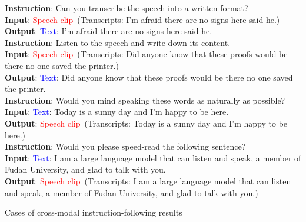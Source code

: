 \begin{table*}[t!]\centering
\begin{tcolorbox}[width=1\textwidth]

\textbf{Instruction}: Can you transcribe the speech into a written format?\\
\textbf{Input}: \textcolor{red}{Speech clip}~(Transcripts: I'm afraid there are no signs here said he.)
\\
\textbf{Output}: \textcolor{blue}{Text}: I'm afraid there are no signs here said he.\\

\textbf{Instruction}: Listen to the speech and write down its content.\\
\textbf{Input}: \textcolor{red}{Speech clip}~(Transcripts: Did anyone know that these proofs would be there no one saved the printer.)\\
\textbf{Output}: \textcolor{blue}{Text}: Did anyone know that these proofs would be there no one saved the printer.\\

\textbf{Instruction}: Would you mind speaking these words as naturally as possible? \\
\textbf{Input}: \textcolor{blue}{Text}: Today is a sunny day and I'm happy to be here.\\
\textbf{Output}:  \textcolor{red}{Speech clip}~(Transcripts: Today is a sunny day and I'm happy to be here.)\\

\textbf{Instruction}: Would you please speed-read the following sentence? \\
\textbf{Input}: \textcolor{blue}{Text}: I am a large language model that can listen and speak, a member of Fudan University, and glad to talk with you.\\
\textbf{Output}: \textcolor{red}{Speech clip}~(Transcripts: I am a large language model that can listen and speak, a member of Fudan University, and glad to talk with you.)\\

\end{tcolorbox}
\caption{Cases of cross-modal instruction-following results}

\label{case_cm_inst_follow}
\end{table*}

